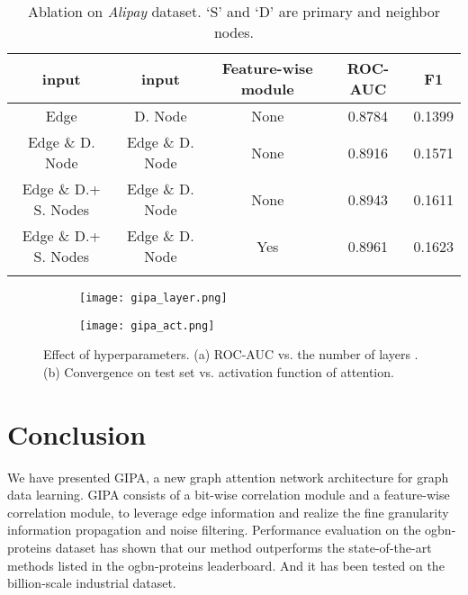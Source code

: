 \documentclass[runningheads]{llncs}
\newcommand{\model}{GIPA\xspace}
\begin{document}
\begin{table}[t]
\centering
\caption{Ablation on \textit{Alipay} dataset. `S' and `D' are  primary and neighbor nodes.}
\begin{tabular}{ccccc}
\hline
 input &  input& Feature-wise module & ROC-AUC & F1  \\ 
\hline
Edge & D. Node  & None & 0.8784 & 0.1399      \\
Edge \&  D. Node  & Edge \&  D. Node & None & 0.8916 & 0.1571    \\
Edge \&  D.+ S. Nodes & Edge \&  D. Node & None &0.8943 &0.1611    \\
Edge \&  D.+ S. Nodes & Edge \&  D. Node & Yes & 0.8961 &0.1623    \\
\hline
\label{tab:ali_performance}
\end{tabular}
\vspace{-0.6cm}
\end{table}
\begin{figure*}[t!]\label{layer}
    \centering
  \begin{subfigure}[b]{0.44\linewidth}
    \texttt{[image: gipa\_layer.png]}
    \caption{ }
    \label{fig:layer}
  \end{subfigure}
   \begin{subfigure}[b]{0.46\linewidth}
    \texttt{[image: gipa\_act.png]}
    \caption{ }
 \label{fig:activation}
  \end{subfigure}
\vspace{-0.3cm}
\caption{Effect of hyperparameters. (a) ROC-AUC vs. the number of layers . (b) Convergence on test set vs. activation function of attention.}
\vspace{-0.3cm}
\end{figure*}

\section{Conclusion}
We have presented \model, a new graph attention network architecture for graph data learning.
\model consists of a bit-wise correlation module and a feature-wise correlation module, to leverage edge information and realize the fine granularity information propagation and noise filtering.
Performance evaluation on the ogbn-proteins dataset has shown that our method outperforms the state-of-the-art methods listed in the ogbn-proteins leaderboard.
And it has been tested on the billion-scale industrial dataset.


\end{document}
